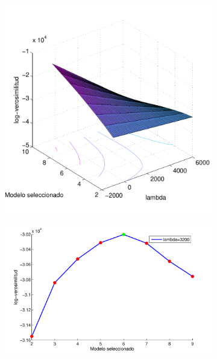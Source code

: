 \begin{figure}[H]
\begin{center}
\begin{subfigure}[b]{0.5\textwidth}
    \includegraphics[height=\textwidth]{gfx/chap6/cuervobic1} 
    \caption{}
  \end{subfigure}
  \begin{subfigure}[b]{0.4\textwidth}
    \includegraphics[height=\textwidth]{gfx/chap6/cuervobic3} 

\end{subfigure}
\end{center}
\end{figure}
